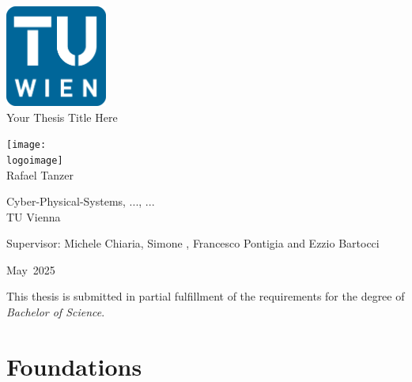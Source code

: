 \documentclass[11pt]{report}
\newcommand{\thesistitle}{Your Thesis Title Here}
\newcommand{\authorname}{Rafael Tanzer}
\newcommand{\supervisor}{Michele Chiaria, Simone , Francesco Pontigia and Ezzio Bartocci}
\newcommand{\institution}{TU Vienna}
\newcommand{\department}{Cyber-Physical-Systems, ..., ...}
\newcommand{\logoimage}{graphics/logo.png} %
\newcommand{\submissionmonth}{May}
\newcommand{\submissionyear}{2025}
\begin{document}
\begin{titlepage}
  \centering
  \vspace*{1cm}

  \includegraphics[width=0.25\textwidth]{graphics/tuWienLogo.png}
  \\[1cm]

  {\Huge \thesistitle\\[1.5cm]}

  \texttt{[image: \\logoimage]}\\[1cm]

  {\Large \authorname\\[0.5cm]}

  {\large \department\\
  \institution\\[1.5cm]}

  {\large Supervisor: \supervisor\\[2cm]}

  {\large \submissionmonth~\submissionyear\\}

  \vfill

  \vspace*{0.5cm}
  {\small This thesis is submitted in partial fulfillment of the requirements for the degree of \textit{Bachelor of Science}.}

\end{titlepage}


\begin{abstract}
\end{abstract}

\tableofcontents

\part{Foundations}
\end{document}
